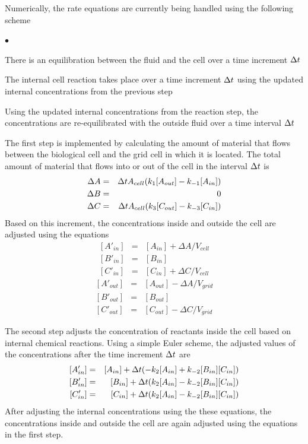 \documentclass[12pt]{article}
\begin{document}
Numerically, the rate equations are currently being handled using the following scheme
\begin{list}{$\bullet$}{}
\item There is an equilibration between the fluid and the cell over a time
increment $\Delta t$
\item The internal cell reaction takes place over a time increment $\Delta t$
using the updated internal concentrations from the previous step
\item Using the updated internal concentrations from the reaction step, the
concentrations are re-equilibrated with the outside fluid over a time interval
$\Delta t$
\end{list}
The first step is implemented by calculating the amount of material that flows
between the biological cell and the grid cell in which it is located.
The total amount of
material that flows into or out of the cell in the interval $\Delta t$ is
\begin{eqnarray*}
\Delta A & = & \Delta t A_{cell}(k_1 [A_{out}]-k_{-1} [A_{in}]) \\
\Delta B & = & 0 \\
\Delta C & = & \Delta t A_{cell}(k_3 [C_{out}]-k_{-3} [C_{in}]) \\
\end{eqnarray*}
Based on this increment, the concentrations inside and outside the cell are
adjusted using the equations
\begin{eqnarray}
\nonumber
[A'_{in}] &=& [A_{in}] + \Delta A/V_{cell} \\
\nonumber
[B'_{in}]  &=& [B_{in}] \\
\nonumber
[C'_{in}] &=& [C_{in}] + \Delta C/V_{cell}
\end{eqnarray}
\begin{eqnarray}
\nonumber
[A'_{out}] &=& [A_{out}] - \Delta A/V_{grid} \\
\nonumber
[B'_{out}]  & = & [B_{out}] \\
\nonumber
[C'_{out}] &=& [C_{out}] - \Delta C/V_{grid}
\end{eqnarray}

The second step adjusts the concentration of reactants inside the cell based on
internal chemical reactions. Using a simple Euler scheme, the adjusted values of
the concentrations after the time increment $\Delta t$ are
\begin{eqnarray}
\nonumber
[A'_{in}] &=& [A_{in}] + \Delta t(-k_2 [A_{in}] + k_{-2} [B_{in}][C_{in}]) \\
\nonumber
[B'_{in}] &=& [B_{in}] + \Delta t(k_2 [A_{in}] - k_{-2} [B_{in}][C_{in}]) \\
\nonumber
[C'_{in}] &=& [C_{in}] + \Delta t(k_2 [A_{in}] - k_{-2} [B_{in}][C_{in}])
\end{eqnarray}
After adjusting the internal concentrations using the these equations, the
concentrations inside and outside the cell are again adjusted using the
equations in the first step.
\end{document}
